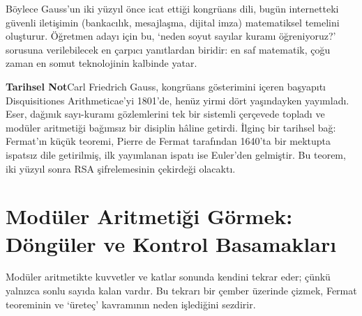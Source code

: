 Böylece Gauss’un iki yüzyıl önce icat ettiği kongrüans dili, bugün internetteki güvenli iletişimin (bankacılık, mesajlaşma, dijital imza) matematiksel temelini oluşturur. Öğretmen adayı için bu, ‘neden soyut sayılar kuramı öğreniyoruz?’ sorusuna verilebilecek en çarpıcı yanıtlardan biridir: en saf matematik, çoğu zaman en somut teknolojinin kalbinde yatar.

\begin{tcolorbox}[bookbox,colback=cDef]\textbf{\textsf{\textcolor{cAcc}{Tarihsel Not}}}\quad Carl Friedrich Gauss, kongrüans gösterimini içeren başyapıtı Disquisitiones Arithmeticae’yi 1801’de, henüz yirmi dört yaşındayken yayımladı. Eser, dağınık sayı-kuramı gözlemlerini tek bir sistemli çerçevede topladı ve modüler aritmetiği bağımsız bir disiplin hâline getirdi. İlginç bir tarihsel bağ: Fermat’ın küçük teoremi, Pierre de Fermat tarafından 1640’ta bir mektupta ispatsız dile getirilmiş, ilk yayımlanan ispatı ise Euler’den gelmiştir. Bu teorem, iki yüzyıl sonra RSA şifrelemesinin çekirdeği olacaktı.\end{tcolorbox}

\section{Modüler Aritmetiği Görmek: Döngüler ve Kontrol Basamakları}

Modüler aritmetikte kuvvetler ve katlar sonunda kendini tekrar eder; çünkü yalnızca sonlu sayıda kalan vardır. Bu tekrarı bir çember üzerinde çizmek, Fermat teoreminin ve ‘üreteç’ kavramının neden işlediğini sezdirir.

